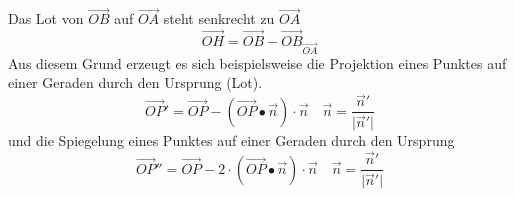 Das Lot von $\overrightarrow{OB}$ auf $\overrightarrow{OA}$ steht senkrecht zu $\overrightarrow{OA}$
\begin{equation}
\boxed{\overrightarrow{OH}=\overrightarrow{OB}-\overrightarrow{OB}_{\overrightarrow{OA}}}
\end{equation}
Aus diesem Grund erzeugt es sich beispielsweise die Projektion eines Punktes auf einer Geraden durch den Ursprung (Lot). 
\begin{equation}
\boxed{\overrightarrow{OP}'=\overrightarrow{OP}-\left(\overrightarrow{OP}\bullet \overrightarrow{n}\right)\cdot \overrightarrow{n}}\quad \boxed{\overrightarrow{n}=\dfrac{\overrightarrow{n}'}{\Big\vert\overrightarrow{n}'\Big\vert}}
\end{equation}
und die Spiegelung eines Punktes auf einer Geraden durch den Ursprung
\begin{equation}
\boxed{\overrightarrow{OP}''=\overrightarrow{OP}-2\cdot \left(\overrightarrow{OP}\bullet \overrightarrow{n}\right)\cdot \overrightarrow{n}}\quad \boxed{\overrightarrow{n}=\dfrac{\overrightarrow{n}'}{\Big\vert\overrightarrow{n}'\Big\vert}}
\end{equation}
